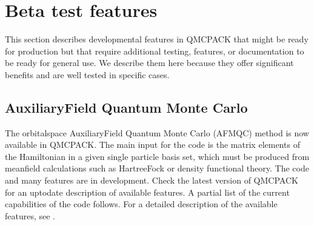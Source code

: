 \documentclass[letterpaper,10pt,english]{sphinxmanual}
\begin{document}
\section{Beta test features}
\label{\detokenize{features:beta-test-features}}
This section describes developmental features in QMCPACK that might be
ready for production but that require additional testing, features, or
documentation to be ready for general use. We describe them here because
they offer significant benefits and are well tested in specific cases.


\subsection{Auxiliary\sphinxhyphen{}Field Quantum Monte Carlo}
\label{\detokenize{features:auxiliary-field-quantum-monte-carlo}}
The orbital\sphinxhyphen{}space Auxiliary\sphinxhyphen{}Field Quantum Monte Carlo (AFMQC) method is
now available in QMCPACK. The main input for the code is the matrix
elements of the Hamiltonian in a given single particle basis set, which
must be produced from mean\sphinxhyphen{}field calculations such as Hartree\sphinxhyphen{}Fock or
density functional theory. The code and many features are in
development. Check the latest version of QMCPACK for an up\sphinxhyphen{}to\sphinxhyphen{}date
description of available features. A partial list of the current
capabilities of the code follows. For a detailed description of the
available features, see  .
\end{document}
